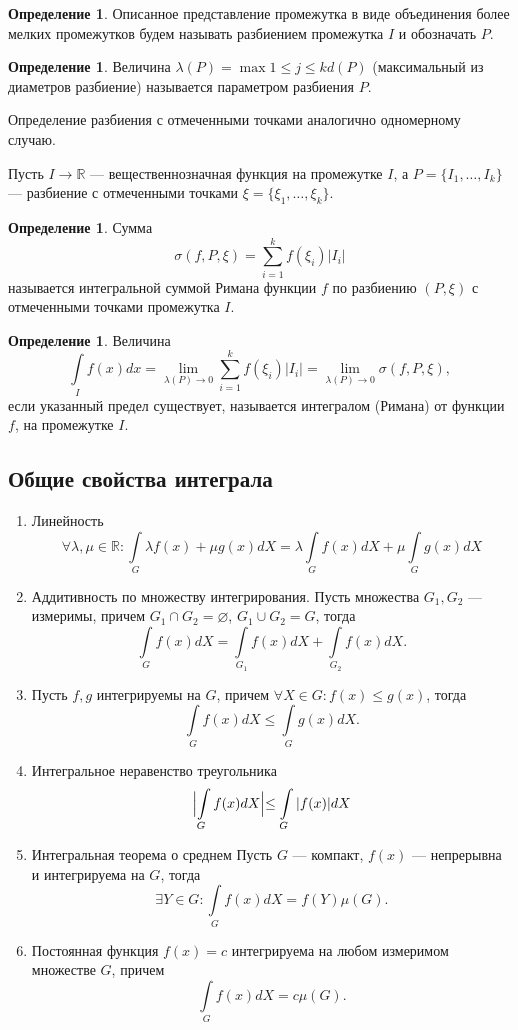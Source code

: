 \documentclass[12pt]{report}
\theoremstyle{definition}
\newtheorem{definition}[theorem]{Определение}
\newcommand{\R}{\mathbb R}
\begin{document}
\begin{definition}
Описанное представление промежутка в виде объединения более мелких промежутков будем
называть разбиением промежутка $I$ и обозначать $P$.
\end{definition}

\begin{definition}
Величина $\lambda(P) = \max\limits{1 \le j \le k} d(P)$ (максимальный из диаметров
разбиение) называется параметром разбиения $P$.
\end{definition}

Определение разбиения с отмеченными точками аналогично одномерному случаю.

Пусть $I \rightarrow \R$ --- вещественнозначная функция на промежутке $I$, а
$P = \{I_1, \dots, I_k\}$ --- разбиение с отмеченными точками $\xi = \{\xi_1, \dots, \xi_k\}$.

\begin{definition}
Сумма
$$
\sigma(f, P, \xi) = \sum\limits_{i=1}^k f(\xi_i) |I_i|
$$
называется интегральной суммой Римана функции $f$ по разбиению $(P, \xi)$
с отмеченными точками промежутка $I$.
\end{definition}

\begin{definition}
Величина
$$
\int\limits_{I} f(x) dx 
= \lim\limits_{\lambda(P) \rightarrow 0} \sum\limits_{i = 1}^k f(\xi_i) |I_i| 
= \lim\limits_{\lambda(P) \rightarrow 0} \sigma(f, P, \xi),
$$
если указанный предел существует, называется интегралом (Римана) от функции $f$,
на промежутке $I$.
\end{definition}

\subsection{Общие свойства интеграла}
\begin{enumerate}
\item Линейность
$$
\forall \lambda, \mu \in \R:
\int\limits_{G} \lambda f(x) + \mu g(x) dX = 
\lambda \int\limits_{G} f(x) dX + \mu \int\limits_{G} g(x) dX
$$
\item Аддитивность по множеству интегрирования.
  Пусть множества $G_1, G_2$ --- измеримы, причем $G_1 \cap G_2 = \varnothing$,
  $G_1 \cup G_2 = G$, тогда
  $$
    \int\limits_G f(x) dX = \int\limits_{G_1} f(x) dX + \int\limits_{G_2} f(x) dX.
  $$
\item Пусть $f, g$ интегрируемы на $G$, причем $\forall X \in G: f(x) \le g(x)$,
тогда
$$
\int\limits_G f(x) dX \le \int\limits_G g(x) dX.
$$

\item Интегральное неравенство треугольника
$$
\Bigl|\int\limits_G f(x) dX\Bigl| \le \int\limits_G |f(x)| dX
$$

\item Интегральная теорема о среднем
  Пусть $G$ --- компакт, $f(x)$ --- непрерывна и интегрируема
 на $G$, тогда
$$
\exists Y \in G: \int\limits_G f(x) dX = f(Y) \mu(G).
$$

\item Постоянная функция $f(x) = c$ интегрируема на любом измеримом
множестве $G$, причем
$$
\int\limits_G f(x) dX = c \mu(G).
$$
\end{enumerate}
\end{document}
